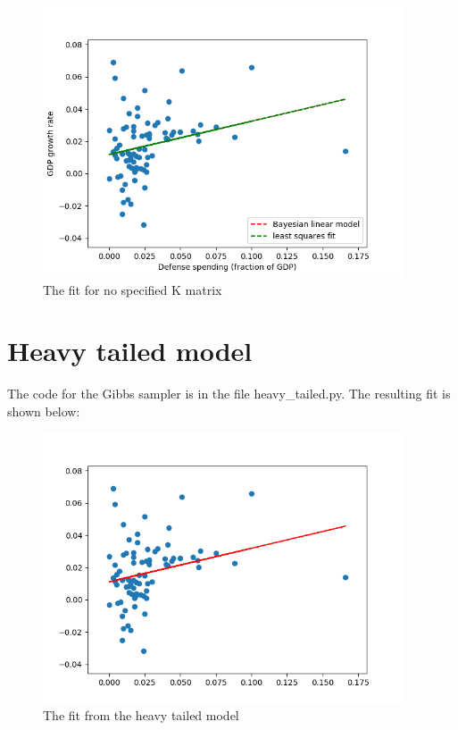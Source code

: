 \documentclass[10pt]{article}
\begin{document}
     \begin{figure}[htb] \centering
         \includegraphics[width=0.95\textwidth]{./linear_bayes.png}
         \caption{The fit for no specified K matrix}
         \label{fig:bayes_no_prior}
     \end{figure}
     \section*{Heavy tailed model}
     The code for the Gibbs sampler is in the file heavy\_tailed.py. The resulting fit is shown below:

     \begin{figure}[htb] \centering
         \includegraphics[width=0.95\textwidth]{./heavy_tail_fit.png}
         \caption{The fit from the heavy tailed model}
         \label{fig:heavy_fit}
     \end{figure}
\end{document}
